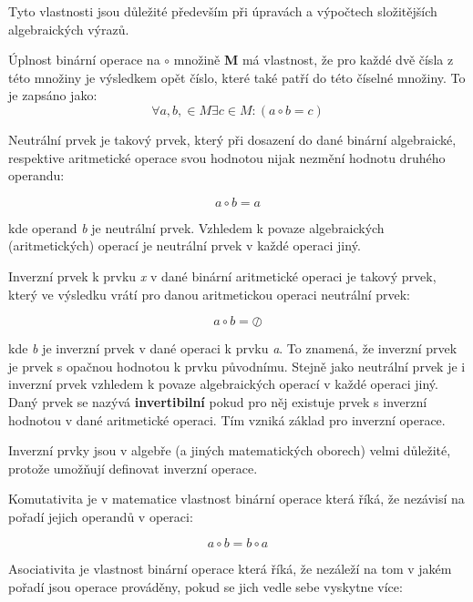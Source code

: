 \vskip 4mm
\vskip 4mm

Tyto vlastnosti jsou důležité především při úpravách a výpočtech složitějších algebraických výrazů.


Úplnost binární operace na $\circ$ množině {\bf M} má vlastnost, že pro každé dvě čísla z této množiny je výsledkem opět číslo, které také patří do této číselné množiny. To je zapsáno jako:
$$ \forall a, b, \in M \exists c \in M: (a \circ b = c) $$


Neutrální prvek je takový prvek, který při dosazení do dané binární algebraické, respektive aritmetické operace svou hodnotou nijak nezmění hodnotu druhého operandu:

$$ a \circ b = a $$

kde operand {\it b} je neutrální prvek. Vzhledem k povaze algebraických (aritmetických) operací je neutrální prvek v každé operaci jiný.


Inverzní prvek k prvku {\it x} v dané binární aritmetické operaci je takový prvek, který ve výsledku vrátí pro danou aritmetickou operaci neutrální prvek:

$$ a \circ b = \oslash $$

kde {\it b} je inverzní prvek v dané operaci k prvku {\it a}. To znamená, že inverzní prvek je prvek s opačnou hodnotou k prvku původnímu. Stejně jako neutrální prvek je i inverzní prvek vzhledem k povaze algebraických operací v každé operaci jiný. Daný prvek se nazývá {\bf invertibilní} pokud pro něj existuje prvek s inverzní hodnotou v dané aritmetické operaci. Tím vzniká základ pro inverzní operace.

Inverzní prvky jsou v algebře (a jiných matematických oborech) velmi důležité, protože umožňují definovat inverzní operace.


Komutativita je v matematice vlastnost binární operace která říká, že nezávisí na pořadí jejich operandů v operaci:

$$ a \circ b = b \circ a $$


Asociativita je vlastnost binární operace která říká, že nezáleží na tom v jakém pořadí jsou operace prováděny, pokud se jich vedle sebe vyskytne více:

